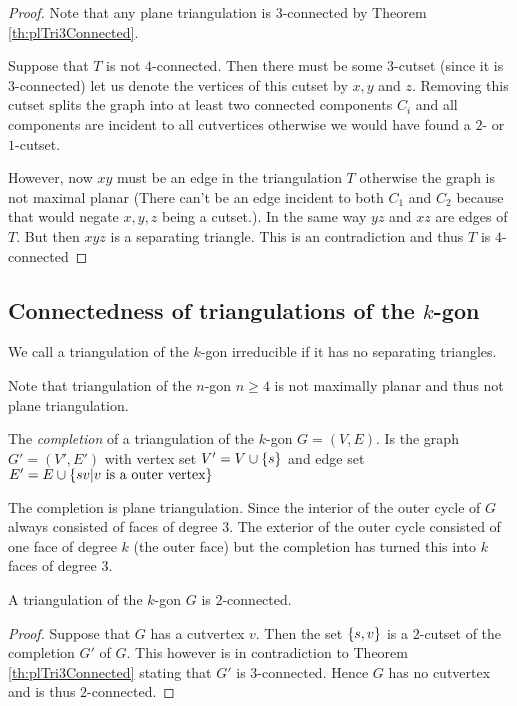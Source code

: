   \begin{proof}
    Note that any plane triangulation is $3$-connected by Theorem \ref{th:plTri3Connected}.

    Suppose that $T$ is not $4$-connected. Then there must be some $3$-cutset (since it is $3$-connected) let us denote the vertices of this cutset by $x, y$ and $z$. Removing this cutset splits the graph into at least two connected components $C_i$ and all components are incident to all cutvertices otherwise we would have found a $2$- or $1$-cutset.

    However, now $xy$ must be an edge in the triangulation $T$ otherwise the graph is not maximal planar (There can't be an edge incident to both $C_1$ and $C_2$ because that would negate $x, y ,z$ being a cutset.). In the same way $yz$ and $xz$ are edges of $T$. But then $xyz$ is a separating triangle. This is an contradiction and thus $T$ is $4$-connected
  \end{proof}

\subsection{Connectedness of triangulations of the $k$-gon}
  \begin{defi}
  We call a triangulation of the $k$-gon irreducible if it has no separating triangles.
  \end{defi}


  Note that triangulation of the $n$-gon $n\geq 4$ is not maximally planar and thus not plane triangulation.

  The \emph{completion} of a triangulation of the $k$-gon $G = (V, E)$. Is the graph $G'= (V', E')$ with vertex set $V' = V \cup \left\lbrace {s} \right\rbrace$ and edge set $E' = E \cup \left\lbrace { sv | v \text{ is a outer vertex}} \right\rbrace$

  The completion is plane triangulation.  %
  Since the interior of the outer cycle of $G$ always consisted of faces of degree 3. The exterior of the outer cycle consisted of one face of degree $k$ (the outer face) but the completion has turned this into $k$ faces of degree $3$.

  \begin{thrm}
  A triangulation of the $k$-gon $G$ is $2$-connected.
  \end{thrm}
  \begin{proof}
  Suppose that $G$ has a cutvertex $v$. Then the set $\left\lbrace {s, v} \right\rbrace$ is a $2$-cutset of the completion $G'$ of $G$. This however is in contradiction to Theorem \ref{th:plTri3Connected} stating that $G'$ is $3$-connected. Hence $G$ has no cutvertex and is thus $2$-connected.
  \end{proof}


